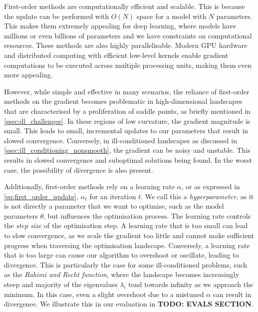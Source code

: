 First-order methods are computationally efficient and scalable. This is because the update can be performed with $O(N)$ space for a model with $N$ parameters. This makes them extremely appealing for deep learning, where models have millions or even billions of parameters and we have constraints on computational resources. These methods are also highly parallelisable. Modern GPU hardware and distributed computing with efficient low-level kernels enable gradient computations to be executed across multiple processing units, making them even more appealing.



However, while simple and effective in many scenarios, the reliance of first-order methods on the gradient becomes problematic in high-dimensional landscapes that are characterised by a proliferation of saddle points, as briefly mentioned in \cref{ssec:dl_challenges}. In these regions of low curvature, the gradient magnitude is small. This leads to small, incremental updates to our parameters that result in slowed convergence. Conversely, in ill-conditioned landscapes as discussed in \cref{ssec:ill_conditioning_nonsmooth}, the gradient can be noisy and unstable. This results in slowed convergence and suboptimal solutions being found. In the worst case, the possibility of divergence is also present. 




Additionally, first-order methods rely on a learning rate $\alpha$, or as expressed in \cref{eq:first_order_update}, $\alpha_t$ for an iteration $t$. We call this a \textit{hyperparameter}, as it is not directly a parameter that we want to optimise, such as the model parameters $\theta$, but influences the optimisation process. The learning rate controls the \textit{step size} of the optimisation step. A learning rate that is too small can lead to slow convergence, as we scale the gradient too little and cannot make sufficient progress when traversing the optimisation landscape. Conversely, a learning rate that is too large can cause our algorithm to overshoot or oscillate, leading to divergence. This is particularly the case for some ill-conditioned problems, such as the \textit{Rahimi and Recht function}, where the landscape becomes increasingly steep and majority of the eigenvalues $\lambda_i$ tend towards infinity as we approach the minimum. In this case, even a slight overshoot due to a mistuned $\alpha$ can result in divergence. We illustrate this in our evaluation in \textbf{TODO: EVALS SECTION}. 



